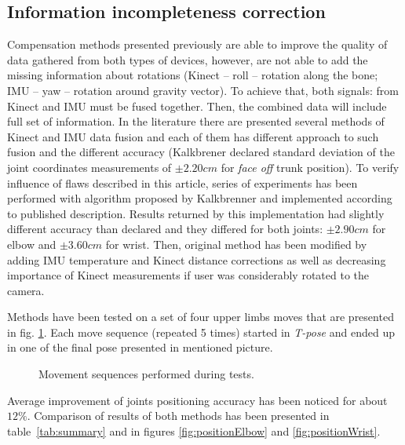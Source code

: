 \documentclass{llncs}
\begin{document}
\subsection{Information incompleteness correction}
Compensation methods presented previously are able to improve the quality of data gathered from both types of devices, however, are not able to add the missing information about rotations (Kinect -- roll -- rotation along the bone; IMU -- yaw -- rotation around gravity vector). To achieve that, both signals: from Kinect and IMU must be fused together. Then, the combined data will include full set of information. In the literature there are presented several methods of Kinect and IMU data fusion \cite{Tian2015,Bo2011,Kalkbrenner2014} and each of them has different approach to such fusion and the different accuracy (Kalkbrener \cite{Kalkbrenner2014} declared standard deviation of the joint coordinates measurements of $\pm2.20cm$ for \textit{face off} trunk position). To verify influence of flaws described in this article, series of experiments has been performed with algorithm proposed by Kalkbrenner and implemented according to published description. Results returned by this implementation had slightly different accuracy than declared and they differed for both joints: $\pm2.90cm$ for elbow and  $\pm3.60cm$ for wrist. Then, original method has been modified by adding IMU temperature and Kinect distance corrections as well as decreasing importance of Kinect measurements if user was considerably rotated to the camera. 

Methods have been tested on a set of four upper limbs moves that are presented in fig. \ref{fig:poses}. Each move sequence (repeated 5 times) started in \textsl{T-pose} and ended up in one of the final pose presented in mentioned picture. 

\begin{figure}[h!]
	\centering
	\vspace{2.5cm}
	\caption{Movement sequences performed during tests.}
	\label{fig:poses}
\end{figure}

Average improvement of joints positioning accuracy has been noticed for about $12\%$. Comparison of results of both methods has been presented in table~\ref{tab:summary} and in figures \ref{fig:positionElbow} and \ref{fig:positionWrist}. 
\end{document}
